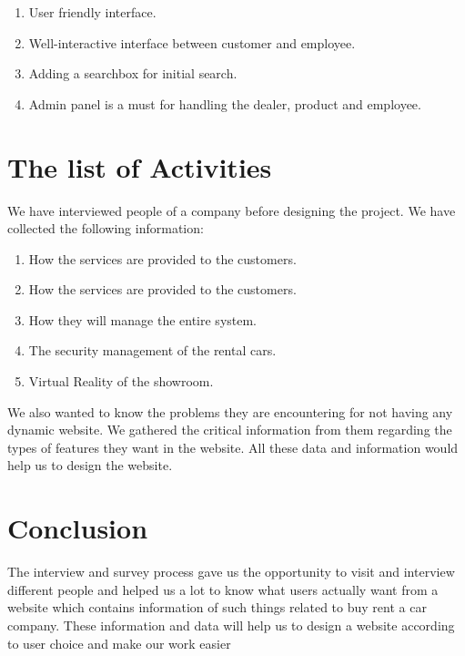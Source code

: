 \begin{enumerate}
\item  User friendly interface.

\item  Well-interactive interface between customer and employee.

\item  Adding a searchbox for initial search.

\item  Admin panel is a must for handling the dealer, product and employee.

\end{enumerate}

\noindent 

\noindent 
\section{ The list of Activities}

\noindent We have interviewed people of a company before designing the project. We have collected the following information:

\begin{enumerate}
\item  How the services are provided to the customers.

\item  How the services are provided to the customers.

\item  How they will manage the entire system.

\item  The security management of the rental cars.

\item  Virtual Reality of the showroom.

\end{enumerate}

\noindent 
\noindent
We also wanted to know the problems they are encountering for not having any dynamic website. We gathered the critical information from them regarding the types of features they want in the website. All these data and information would help us to design the website.

\noindent 
\noindent

\section{ Conclusion}

\noindent The interview and survey process gave us the opportunity to visit and interview different people and helped us a lot to know what users actually want from a website which contains information of such things related to buy rent a car company. These information and data will help us to design a website according to user choice and make our work easier

\noindent 

\noindent 

\noindent 

\noindent 

